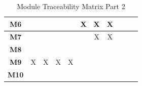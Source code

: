 \documentclass[12pt, titlepage]{article}
\begin{document}
\begin{table}[H]
\begin{tabular}{|c|c|c|c|c|c|c|c|c|c|c|}
    \textbf{M6}  &                     &                     &                     &                     & X                     & X                     & X                     &                       &                       &                       \\ \hline
    \textbf{M7}  &                     &                     &                     &                     &                       & X                     & X                     &                       &                       &                       \\ \hline
    \textbf{M8}  &                     &                     &                     &                     &                       &                       &                       &                       &                       &                       \\ \hline
    \textbf{M9}  & X                   & X                   & X                   & X                   &                       &                       &                       &                       &                       &                       \\ \hline
    \textbf{M10} &                     &                     &                     &                     &                       &                       &                       &                       &                       &                       \\ \hline
  \end{tabular}
  \caption{Module Traceability Matrix Part 2}
  \label{Table:B_Mod_trace}
\end{table}
\end{document}
